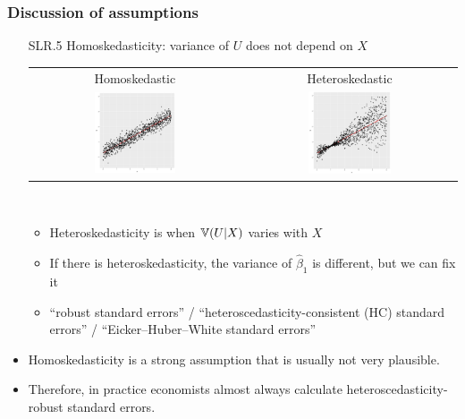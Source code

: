 \begin{frame}[allowframebreaks]
  \frametitle{Discussion of assumptions}
  \begin{itemize}
  \item[SLR.5] Homoskedasticity: variance of $U$ does not
    depend on $X$ \\
    \begin{tabular}{cc} 
      \alert{Homoskedastic} & \alert{Heteroskedastic} \\ 
      \includegraphics[width=0.4\textwidth]{homoskedastic} &
      \includegraphics[width=0.4\textwidth]{heteroskedastic} 
    \end{tabular} \\
    \begin{itemize}
    \item \alert{Heteroskedasticity} is when $\mathbb{V}(U|X)$ varies
      with $X$
    \item If there is heteroskedasticity, the variance of
      $\hat{\beta}_1$ is different, but we can fix it 
    \item ``robust standard errors'' / ``heteroscedasticity-consistent
      (HC) standard errors'' / ``Eicker–Huber–White standard errors''
    \end{itemize}
\item Homoskedasticity is a strong assumption that is usually not very
plausible. 
\item Therefore, in practice economists almost always calculate
heteroscedasticity-robust standard errors. 
\end{itemize}
\end{frame}


